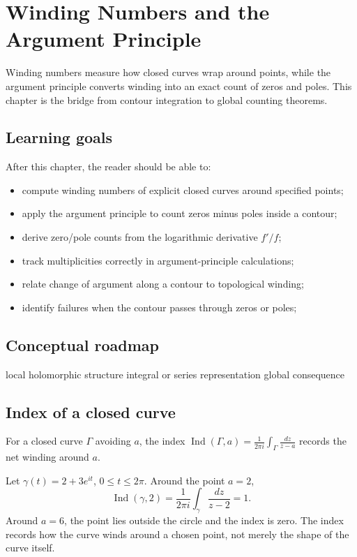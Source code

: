 \chapter{Winding Numbers and the Argument Principle}
\label{ch:iv12}

Winding numbers measure how closed curves wrap around points, while the argument principle converts winding into an exact count of zeros and poles. This chapter is the bridge from contour integration to global counting theorems.

\section*{Learning goals}
After this chapter, the reader should be able to:
\begin{itemize}
\item compute winding numbers of explicit closed curves around specified points;
\item apply the argument principle to count zeros minus poles inside a contour;
\item derive zero/pole counts from the logarithmic derivative \(f'/f\);
\item track multiplicities correctly in argument-principle calculations;
\item relate change of argument along a contour to topological winding;
\item identify failures when the contour passes through zeros or poles;
\end{itemize}
\section*{Conceptual roadmap}
\volroadmap
  {local holomorphic structure}
  {integral or series representation}
  {global consequence}

\section{Index of a closed curve}
For a closed curve $\Gamma$ avoiding $a$, the index $\operatorname{Ind}(\Gamma,a)=\frac{1}{2\pi i}\int_\Gamma \frac{dz}{z-a}$ records the net winding around $a$.

\begin{example}\label{ex:iv12-expand-01}
Let \(\gamma(t)=2+3e^{it}\), \(0\le t\le2\pi\). Around the point \(a=2\),
\[
\operatorname{Ind}(\gamma,2)=\frac{1}{2\pi i}\int_\gamma\frac{dz}{z-2}=1.
\]
Around \(a=6\), the point lies outside the circle and the index is zero. The index records how the curve winds around a chosen point, not merely the shape of the curve itself.
\end{example}
